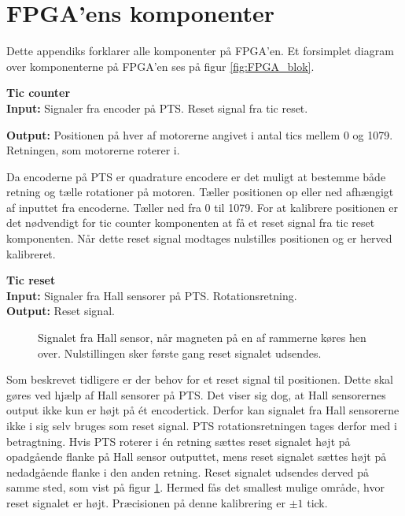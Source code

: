 \section{FPGA'ens komponenter}
\label{sec:fpgaappendix}
Dette appendiks forklarer alle komponenter på FPGA'en.
Et forsimplet diagram over komponenterne på FPGA'en ses på figur \ref{fig:FPGA_blok}.


\textbf{Tic counter}\\
\textbf{Input:}
Signaler fra encoder på PTS. Reset signal fra tic reset.

\textbf{Output:} Positionen på hver af motorerne angivet i antal tics mellem 0 
og 1079. Retningen, som motorerne roterer i. 

Da encoderne på PTS er quadrature encodere er det muligt at bestemme både retning og 
tælle rotationer på motoren.
Tæller positionen op eller ned afhængigt af inputtet fra encoderne. 
Tæller ned fra 0 til 1079.
For at kalibrere positionen er det nødvendigt for tic counter komponenten at få 
et reset signal fra tic reset komponenten. 
Når dette reset signal modtages nulstilles positionen og er herved kalibreret.

\textbf{Tic reset}\\
\textbf{Input:} Signaler fra Hall sensorer på PTS. Rotationsretning.\\
\textbf{Output:} Reset signal.

\begin{figure}[!th]
\centering

\caption[Signal fra Hall sensor]{Signalet fra Hall sensor, når magneten på en af rammerne køres hen over. Nulstillingen sker første gang reset signalet udsendes.}
\label{fig:hall_sensor_signal}
\end{figure}

Som beskrevet tidligere er der behov for et reset signal til positionen. 
Dette skal gøres ved hjælp af Hall sensorer på PTS. 
Det viser sig dog, at Hall sensorernes output ikke kun er højt på ét encodertick. 
Derfor kan signalet fra Hall sensorerne ikke i sig selv bruges som reset signal.
PTS rotationsretningen tages derfor med i betragtning.
Hvis PTS roterer i én retning sættes reset signalet højt på opadgående 
flanke på Hall sensor outputtet, mens reset signalet sættes højt på nedadgående 
flanke i den anden retning. Reset signalet udsendes derved på samme sted, som vist på figur \ref{fig:hall_sensor_signal}.
Hermed fås det smallest mulige område, hvor reset signalet er højt.
Præcisionen på denne kalibrering er \(\pm1\) tick.


